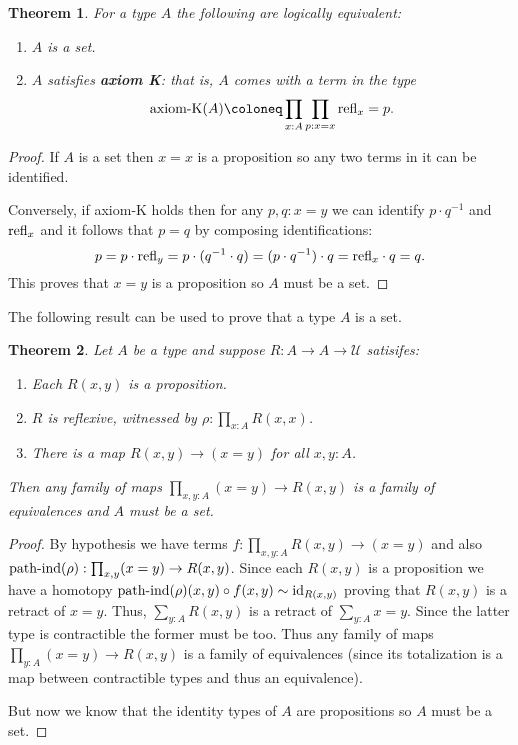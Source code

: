 \documentclass{amsart}
\theoremstyle{theorem}
\newtheorem*{thm}{Theorem}
\theoremstyle{definition}
\theoremstyle{remark}
\newcommand{\0}{\mathbbe{0}}
\newcommand{\1}{\mathbbe{1}}
\newcommand{\2}{\mathbbe{2}}
\newcommand{\3}{\mathbbe{3}}
\newcommand{\4}{\mathbbe{4}}
\newcommand{\term}[1]{{\textup{#1}}}
\newcommand{\type}[1]{{\textup{#1}}}
\newcommand{\id}{\term{id}}
\newcommand{\refl}{\term{refl}}
\newcommand{\UU}{{\mathcal{U}}}
\begin{document}
\begin{thm} For a type $A$ the following are logically equivalent:
\begin{enumerate}
\item $A$ is a set.
\item $A$ satisfies \textbf{axiom K}: that is, $A$ comes with a term in the type
\[ \type{axiom-K}(A) \coloneq \prod_{x:A} \prod_{p : x =x} \refl_x = p.\]
\end{enumerate}
\end{thm}
\begin{proof}
If $A$ is a set then $x=x$ is a proposition so any two terms in it can be identified.

Conversely, if axiom-K holds then for any $p,q : x =y$ we can identify $p \cdot q^{-1}$ and $\refl_x$ and it follows that $p=q$ by composing identifications:
\[ p = p \cdot \refl_y = p \cdot (q^{-1} \cdot q) = (p \cdot q^{-1}) \cdot q = \refl_x \cdot q = q.\] This proves that $x=y$ is a proposition so $A$ must be a set.
\end{proof}

The following result can be used to prove that a type $A$ is a set.

\begin{thm} Let $A$ be a type and suppose $R \colon A \to A \to \UU$ satisifes:
\begin{enumerate}
\item Each $R(x,y)$ is a proposition.
\item $R$ is reflexive, witnessed by $\rho : \prod_{x:A} R(x,x)$.
\item There is a map $R(x,y) \to (x=y)$ for all $x,y:A$.
\end{enumerate}
Then any family of maps $\prod_{x,y:A} (x=y) \to R(x,y)$ is a family of equivalences and $A$ must be a set.
\end{thm}
\begin{proof}
By hypothesis we have terms $f : \prod_{x,y:A} R(x,y) \to (x=y)$ and also $\term{path-ind}(\rho) : \prod_{x,y} (x=y) \to R(x,y)$. Since each $R(x,y)$ is a proposition we have a homotopy $\term{path-ind}(\rho)(x,y) \circ f(x,y) \sim \id_{R(x,y)}$ proving that $R(x,y)$ is a retract of $x=y$. Thus, $\sum_{y:A} R(x,y)$ is a retract of $\sum_{y:A} x=y$. Since the latter type is contractible the former must be too. Thus any family of maps $\prod_{y:A}(x=y) \to R(x,y)$ is a family of equivalences (since its totalization is a map between contractible types and thus an equivalence).

But now we know that the identity types of $A$ are propositions so $A$ must be a set.
\end{proof}
\end{document}
